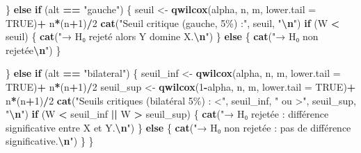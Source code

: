 \documentclass[
  12pt,
]{article}
\newenvironment{Shaded}{\begin{snugshade}}{\end{snugshade}}
\newcommand{\AttributeTok}[1]{\textcolor[rgb]{0.13,0.29,0.53}{#1}}
\newcommand{\ConstantTok}[1]{\textcolor[rgb]{0.56,0.35,0.01}{#1}}
\newcommand{\ControlFlowTok}[1]{\textcolor[rgb]{0.13,0.29,0.53}{\textbf{#1}}}
\newcommand{\DecValTok}[1]{\textcolor[rgb]{0.00,0.00,0.81}{#1}}
\newcommand{\FunctionTok}[1]{\textcolor[rgb]{0.13,0.29,0.53}{\textbf{#1}}}
\newcommand{\NormalTok}[1]{#1}
\newcommand{\OtherTok}[1]{\textcolor[rgb]{0.56,0.35,0.01}{#1}}
\newcommand{\SpecialCharTok}[1]{\textcolor[rgb]{0.81,0.36,0.00}{\textbf{#1}}}
\newcommand{\StringTok}[1]{\textcolor[rgb]{0.31,0.60,0.02}{#1}}
\begin{document}
\begin{Shaded}
\begin{Highlighting}[]
\NormalTok{    \} }\ControlFlowTok{else} \ControlFlowTok{if}\NormalTok{ (alt }\SpecialCharTok{==} \StringTok{"gauche"}\NormalTok{) \{}
\NormalTok{      seuil }\OtherTok{\textless{}{-}} \FunctionTok{qwilcox}\NormalTok{(alpha, n, m, }\AttributeTok{lower.tail =} \ConstantTok{TRUE}\NormalTok{)}\SpecialCharTok{+}\NormalTok{ n}\SpecialCharTok{*}\NormalTok{(n}\SpecialCharTok{+}\DecValTok{1}\NormalTok{)}\SpecialCharTok{/}\DecValTok{2}
      \FunctionTok{cat}\NormalTok{(}\StringTok{"Seuil critique (gauche, 5\%) :"}\NormalTok{, seuil, }\StringTok{"}\SpecialCharTok{\textbackslash{}n}\StringTok{"}\NormalTok{)}
      \ControlFlowTok{if}\NormalTok{ (W }\SpecialCharTok{\textless{}}\NormalTok{ seuil) \{}
        \FunctionTok{cat}\NormalTok{(}\StringTok{"→ H₀ rejeté alors Y domine X.}\SpecialCharTok{\textbackslash{}n}\StringTok{"}\NormalTok{)}
\NormalTok{      \} }\ControlFlowTok{else}\NormalTok{ \{}
        \FunctionTok{cat}\NormalTok{(}\StringTok{"→ H₀ non rejetée}\SpecialCharTok{\textbackslash{}n}\StringTok{"}\NormalTok{)}
\NormalTok{      \}}
      
\NormalTok{    \} }\ControlFlowTok{else} \ControlFlowTok{if}\NormalTok{ (alt }\SpecialCharTok{==} \StringTok{"bilateral"}\NormalTok{) \{}
\NormalTok{      seuil\_inf }\OtherTok{\textless{}{-}} \FunctionTok{qwilcox}\NormalTok{(alpha, n, m, }\AttributeTok{lower.tail =} \ConstantTok{TRUE}\NormalTok{)}\SpecialCharTok{+}\NormalTok{ n}\SpecialCharTok{*}\NormalTok{(n}\SpecialCharTok{+}\DecValTok{1}\NormalTok{)}\SpecialCharTok{/}\DecValTok{2}
\NormalTok{      seuil\_sup }\OtherTok{\textless{}{-}} \FunctionTok{qwilcox}\NormalTok{(}\DecValTok{1}\SpecialCharTok{{-}}\NormalTok{alpha, n, m, }\AttributeTok{lower.tail =} \ConstantTok{TRUE}\NormalTok{)}\SpecialCharTok{+}\NormalTok{ n}\SpecialCharTok{*}\NormalTok{(n}\SpecialCharTok{+}\DecValTok{1}\NormalTok{)}\SpecialCharTok{/}\DecValTok{2}
      \FunctionTok{cat}\NormalTok{(}\StringTok{"Seuils critiques (bilatéral 5\%) : \textless{}"}\NormalTok{, seuil\_inf, }\StringTok{" ou \textgreater{}"}\NormalTok{, seuil\_sup, }\StringTok{"}\SpecialCharTok{\textbackslash{}n}\StringTok{"}\NormalTok{)}
      \ControlFlowTok{if}\NormalTok{ (W }\SpecialCharTok{\textless{}}\NormalTok{ seuil\_inf }\SpecialCharTok{||}\NormalTok{ W }\SpecialCharTok{\textgreater{}}\NormalTok{ seuil\_sup) \{}
        \FunctionTok{cat}\NormalTok{(}\StringTok{"→ H₀ rejetée : différence significative entre X et Y.}\SpecialCharTok{\textbackslash{}n}\StringTok{"}\NormalTok{)}
\NormalTok{      \} }\ControlFlowTok{else}\NormalTok{ \{}
        \FunctionTok{cat}\NormalTok{(}\StringTok{"→ H₀ non rejetée : pas de différence significative.}\SpecialCharTok{\textbackslash{}n}\StringTok{"}\NormalTok{)}
\NormalTok{      \}}
\NormalTok{    \}}
    

\end{Highlighting}
\end{Shaded}
\end{document}

